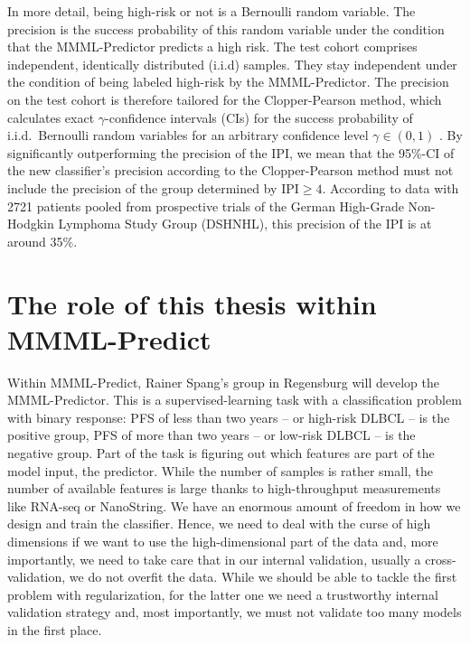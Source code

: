 In more detail, being high-risk or not is a Bernoulli random variable. 
The precision is the success probability of this random variable under the condition that the 
MMML-Predictor predicts a high risk. The test cohort comprises independent, identically distributed 
(i.i.d) samples. They stay independent under the condition of being labeled high-risk by the 
MMML-Predictor. The precision on the test cohort is therefore tailored for the Clopper-Pearson 
method, which calculates exact $\gamma$-confidence intervals (CIs) for the success probability 
of i.i.d.\ Bernoulli random variables for an arbitrary confidence level $\gamma \in (0, 1)$
\cite{clopper34}.
By significantly outperforming the precision of the IPI, we mean that the \num{95}\%-CI
of the new classifier's precision according to the Clopper-Pearson method must not include the 
precision of the group determined by $\text{IPI} \geq 4$. According to data with \num{2721} 
patients pooled from prospective trials of the German High-Grade Non-Hodgkin Lymphoma Study Group 
(DSHNHL), this precision of the IPI is at around \num{35}\%. 

\section{The role of this thesis within MMML-Predict}

Within MMML-Predict, Rainer Spang's group in Regensburg will develop the MMML-Predictor. 
This is 
a supervised-learning task with a classification problem with binary response: PFS of less 
than two years -- or high-risk DLBCL -- is the positive group, PFS of more than two 
years -- or low-risk DLBCL -- is the negative group. Part of the task is figuring out which features
are part of the model input, the predictor.
While the number of samples is rather small, 
the number of available features is large thanks to high-throughput measurements like RNA-seq or 
NanoString. We have an enormous amount of freedom in how we design and train the classifier. 
Hence, we need to deal with the curse of high dimensions if we want to use the high-dimensional part 
of the data and, 
more importantly, we need to take care that in our internal validation, usually a cross-validation,
we do not overfit the data. While we should be able to tackle the first problem with regularization,
for the latter one we need a trustworthy internal validation strategy and, most importantly, we 
must not validate too many models in the first place.

